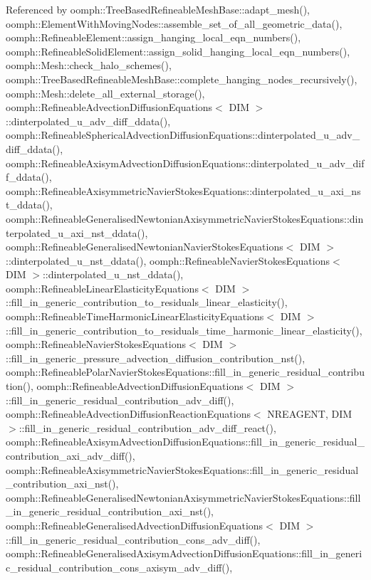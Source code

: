 Referenced by oomph\+::\+Tree\+Based\+Refineable\+Mesh\+Base\+::adapt\+\_\+mesh(), oomph\+::\+Element\+With\+Moving\+Nodes\+::assemble\+\_\+set\+\_\+of\+\_\+all\+\_\+geometric\+\_\+data(), oomph\+::\+Refineable\+Element\+::assign\+\_\+hanging\+\_\+local\+\_\+eqn\+\_\+numbers(), oomph\+::\+Refineable\+Solid\+Element\+::assign\+\_\+solid\+\_\+hanging\+\_\+local\+\_\+eqn\+\_\+numbers(), oomph\+::\+Mesh\+::check\+\_\+halo\+\_\+schemes(), oomph\+::\+Tree\+Based\+Refineable\+Mesh\+Base\+::complete\+\_\+hanging\+\_\+nodes\+\_\+recursively(), oomph\+::\+Mesh\+::delete\+\_\+all\+\_\+external\+\_\+storage(), oomph\+::\+Refineable\+Advection\+Diffusion\+Equations$<$ D\+I\+M $>$\+::dinterpolated\+\_\+u\+\_\+adv\+\_\+diff\+\_\+ddata(), oomph\+::\+Refineable\+Spherical\+Advection\+Diffusion\+Equations\+::dinterpolated\+\_\+u\+\_\+adv\+\_\+diff\+\_\+ddata(), oomph\+::\+Refineable\+Axisym\+Advection\+Diffusion\+Equations\+::dinterpolated\+\_\+u\+\_\+adv\+\_\+diff\+\_\+ddata(), oomph\+::\+Refineable\+Axisymmetric\+Navier\+Stokes\+Equations\+::dinterpolated\+\_\+u\+\_\+axi\+\_\+nst\+\_\+ddata(), oomph\+::\+Refineable\+Generalised\+Newtonian\+Axisymmetric\+Navier\+Stokes\+Equations\+::dinterpolated\+\_\+u\+\_\+axi\+\_\+nst\+\_\+ddata(), oomph\+::\+Refineable\+Generalised\+Newtonian\+Navier\+Stokes\+Equations$<$ D\+I\+M $>$\+::dinterpolated\+\_\+u\+\_\+nst\+\_\+ddata(), oomph\+::\+Refineable\+Navier\+Stokes\+Equations$<$ D\+I\+M $>$\+::dinterpolated\+\_\+u\+\_\+nst\+\_\+ddata(), oomph\+::\+Refineable\+Linear\+Elasticity\+Equations$<$ D\+I\+M $>$\+::fill\+\_\+in\+\_\+generic\+\_\+contribution\+\_\+to\+\_\+residuals\+\_\+linear\+\_\+elasticity(), oomph\+::\+Refineable\+Time\+Harmonic\+Linear\+Elasticity\+Equations$<$ D\+I\+M $>$\+::fill\+\_\+in\+\_\+generic\+\_\+contribution\+\_\+to\+\_\+residuals\+\_\+time\+\_\+harmonic\+\_\+linear\+\_\+elasticity(), oomph\+::\+Refineable\+Navier\+Stokes\+Equations$<$ D\+I\+M $>$\+::fill\+\_\+in\+\_\+generic\+\_\+pressure\+\_\+advection\+\_\+diffusion\+\_\+contribution\+\_\+nst(), oomph\+::\+Refineable\+Polar\+Navier\+Stokes\+Equations\+::fill\+\_\+in\+\_\+generic\+\_\+residual\+\_\+contribution(), oomph\+::\+Refineable\+Advection\+Diffusion\+Equations$<$ D\+I\+M $>$\+::fill\+\_\+in\+\_\+generic\+\_\+residual\+\_\+contribution\+\_\+adv\+\_\+diff(), oomph\+::\+Refineable\+Advection\+Diffusion\+Reaction\+Equations$<$ N\+R\+E\+A\+G\+E\+N\+T, D\+I\+M $>$\+::fill\+\_\+in\+\_\+generic\+\_\+residual\+\_\+contribution\+\_\+adv\+\_\+diff\+\_\+react(), oomph\+::\+Refineable\+Axisym\+Advection\+Diffusion\+Equations\+::fill\+\_\+in\+\_\+generic\+\_\+residual\+\_\+contribution\+\_\+axi\+\_\+adv\+\_\+diff(), oomph\+::\+Refineable\+Axisymmetric\+Navier\+Stokes\+Equations\+::fill\+\_\+in\+\_\+generic\+\_\+residual\+\_\+contribution\+\_\+axi\+\_\+nst(), oomph\+::\+Refineable\+Generalised\+Newtonian\+Axisymmetric\+Navier\+Stokes\+Equations\+::fill\+\_\+in\+\_\+generic\+\_\+residual\+\_\+contribution\+\_\+axi\+\_\+nst(), oomph\+::\+Refineable\+Generalised\+Advection\+Diffusion\+Equations$<$ D\+I\+M $>$\+::fill\+\_\+in\+\_\+generic\+\_\+residual\+\_\+contribution\+\_\+cons\+\_\+adv\+\_\+diff(), oomph\+::\+Refineable\+Generalised\+Axisym\+Advection\+Diffusion\+Equations\+::fill\+\_\+in\+\_\+generic\+\_\+residual\+\_\+contribution\+\_\+cons\+\_\+axisym\+\_\+adv\+\_\+diff(), 